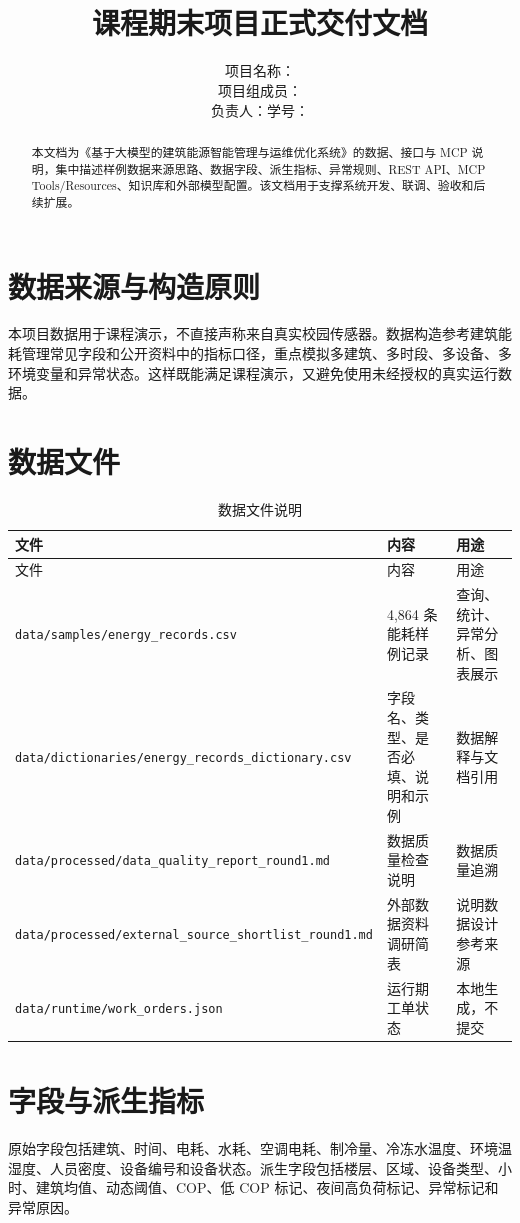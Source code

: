 \documentclass[12pt,a4paper]{ctexart}
\title{
    \vspace{-2em}
    \heiti \zihao{2} \reporttitle \\
    \vspace{1em}
    \zihao{4} 课程期末项目正式交付文档
}
\author{
    \songti \zihao{4}
    项目名称：\projectname \\
    项目组成员：\teamname \\
    负责人：\studentname \quad 学号：\studentid
}
\date{\docdate}
\newcommand{\projectname}{基于大模型的建筑能源智能管理与运维优化系统}
\newcommand{\code}[1]{{\footnotesize\nolinkurl{#1}}}
\begin{document}
\maketitle
\thispagestyle{fancy}

\begin{abstract}
本文档为《\projectname》的数据、接口与 MCP 说明，集中描述样例数据来源思路、数据字段、派生指标、异常规则、REST API、MCP Tools/Resources、知识库和外部模型配置。该文档用于支撑系统开发、联调、验收和后续扩展。
\end{abstract}

\tableofcontents
\newpage

\section{数据来源与构造原则}
本项目数据用于课程演示，不直接声称来自真实校园传感器。数据构造参考建筑能耗管理常见字段和公开资料中的指标口径，重点模拟多建筑、多时段、多设备、多环境变量和异常状态。这样既能满足课程演示，又避免使用未经授权的真实运行数据。

\section{数据文件}
\begin{longtable}{p{4cm}p{5.5cm}p{4.5cm}}
\caption{数据文件说明}\\
\toprule
文件 & 内容 & 用途 \\
\midrule
\endfirsthead
\toprule
文件 & 内容 & 用途 \\
\midrule
\endhead
\code{data/samples/energy_records.csv} & 4,864 条能耗样例记录 & 查询、统计、异常分析、图表展示 \\
\code{data/dictionaries/energy_records_dictionary.csv} & 字段名、类型、是否必填、说明和示例 & 数据解释与文档引用 \\
\code{data/processed/data_quality_report_round1.md} & 数据质量检查说明 & 数据质量追溯 \\
\code{data/processed/external_source_shortlist_round1.md} & 外部数据资料调研简表 & 说明数据设计参考来源 \\
\code{data/runtime/work_orders.json} & 运行期工单状态 & 本地生成，不提交 \\
\bottomrule
\end{longtable}

\section{字段与派生指标}
原始字段包括建筑、时间、电耗、水耗、空调电耗、制冷量、冷冻水温度、环境温湿度、人员密度、设备编号和设备状态。派生字段包括楼层、区域、设备类型、小时、建筑均值、动态阈值、COP、低 COP 标记、夜间高负荷标记、异常标记和异常原因。
\end{document}
